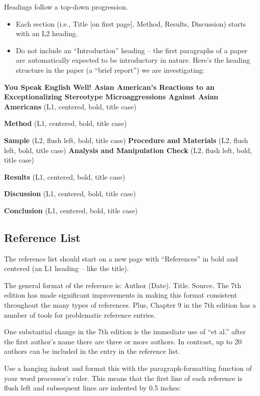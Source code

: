 \documentclass[
  english,
]{book}
\providecommand{\tightlist}{%
  \setlength{\itemsep}{0pt}\setlength{\parskip}{0pt}}
\begin{document}
Headings follow a top-down progression.

\begin{itemize}
\tightlist
\item
  Each section (i.e., Title {[}on first page{]}, Method, Results, Discussion) starts with an L2 heading.
\item
  Do not include an ``Introduction'' heading -- the first paragraphs of a paper are automatically expected to be introductory in nature.
  Here's the heading structure in the paper (a ``brief report'') we are investigating:
\end{itemize}

\textbf{You Speak English Well! Asian American's Reactions to an Exceptionalizing Stereotype Microaggressions Against Asian Americans} (L1, centered, bold, title case)

\textbf{Method} (L1, centered, bold, title case)

\textbf{Sample} (L2, flush left, bold, title case)
\textbf{Procedure and Materials} (L2, flush left, bold, title case)
\textbf{Analysis and Manipulation Check} (L2, flush left, bold, title case)

\textbf{Results} (L1, centered, bold, title case)

\textbf{Discussion} (L1, centered, bold, title case)

\textbf{Conclusion} (L1, centered, bold, title case)

\hypertarget{reference-list}{%
\subsection{Reference List}\label{reference-list}}

The reference list should start on a new page with ``References'' in bold and centered (an L1 heading -- like the title).

The general format of the reference is: Author (Date). Title. Source. The 7th edition has made significant improvements in making this format consistent throughout the many types of references. Plus, Chapter 9 in the 7th edition has a number of tools for problematic reference entries.

One substantial change in the 7th edition is the immediate use of ``et al.'' after the first author's name there are three or more authors. In contrast, up to 20 authors can be included in the entry in the reference list.

Use a hanging indent and format this with the paragraph-formatting function of your word processor's ruler. This means that the first line of each reference is flush left and subsequent lines are indented by 0.5 inches:
\end{document}
